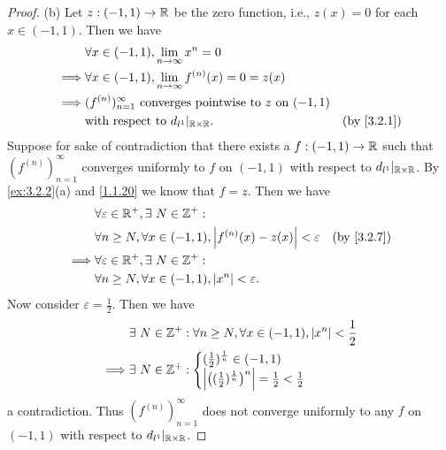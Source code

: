 \begin{proof}{(b)}
  Let \(z : (-1, 1) \to \mathbb{R}\) be the zero function, i.e., \(z(x) = 0\) for each \(x \in (-1, 1)\).
  Then we have
  \begin{align*}
             & \forall x \in (-1, 1), \lim_{n \to \infty} x^n = 0                                                        \\
    \implies & \forall x \in (-1, 1), \lim_{n \to \infty} f^{(n)}(x) = 0 = z(x)                                          \\
    \implies & (f^{(n)})_{n = 1}^\infty \text{ converges pointwise to } z \text{ on } (-1, 1)                            \\
             & \text{with respect to } d_{l^1}|_{\R \times \R}.                               & \text{(by \cref{3.2.1})}
  \end{align*}
  Suppose for sake of contradiction that there exists a \(f : (-1, 1) \to \mathbb{R}\) such that \((f^{(n)})_{n = 1}^\infty\) converges uniformly to \(f\) on \((-1, 1)\) with respect to \(d_{l^1}|_{\mathbb{R} \times \mathbb{R}}\).
  By \cref{ex:3.2.2}(a) and \cref{1.1.20} we know that \(f = z\).
  Then we have
  \begin{align*}
             & \forall \varepsilon \in \R^+, \exists\ N \in \Z^+ :                                                       \\
             & \forall n \geq N, \forall x \in (-1, 1), \abs{f^{(n)}(x) - z(x)} < \varepsilon & \text{(by \cref{3.2.7})} \\
    \implies & \forall \varepsilon \in \R^+, \exists\ N \in \Z^+ :                                                       \\
             & \forall n \geq N, \forall x \in (-1, 1), \abs{x^n} < \varepsilon.
  \end{align*}
  Now consider \(\varepsilon = \frac{1}{2}\).
  Then we have
  \begin{align*}
             & \exists\ N \in \mathbb{Z}^+ : \forall n \geq N, \forall x \in (-1, 1), \left\lvert x^n\right\rvert < \frac{1}{2}                                              \\
    \implies & \exists\ N \in \mathbb{Z}^+ : \begin{cases}
                                       (\frac{1}{2})^{\frac{1}{n}} \in (-1, 1) \\
                                       \left\lvert\big((\frac{1}{2})^{\frac{1}{n}}\big)^n\right\rvert = \frac{1}{2} < \frac{1}{2}
                                     \end{cases}
  \end{align*}
  a contradiction.
  Thus \((f^{(n)})_{n = 1}^\infty\) does not converge uniformly to any \(f\) on \((-1, 1)\) with respect to \(d_{l^1}|_{\mathbb{R} \times \mathbb{R}}\).
\end{proof}

